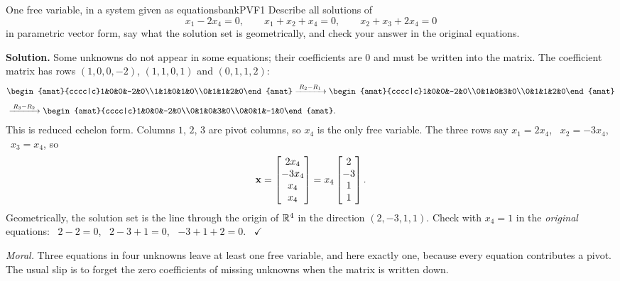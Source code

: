 \documentclass[11pt]{article}
\begin{document}
\begin{exmp}{One free variable, in a system given as equations}{bankPVF1}
Describe all solutions of
\[
x_1-2x_4=0,\qquad x_1+x_2+x_4=0,\qquad x_2+x_3+2x_4=0
\]
in parametric vector form, say what the solution set is geometrically, and check your answer in the original equations.

\textbf{Solution.} Some unknowns do not appear in some equations; their coefficients are $0$ and must be written into the matrix. The coefficient matrix has rows $(1,0,0,-2)$, $(1,1,0,1)$ and $(0,1,1,2)$:
\begin{align*}
&\begin{amat}{cccc|c}1&0&0&-2&0\\1&1&0&1&0\\0&1&1&2&0\end{amat}
\rops{R_2-R_1}
\begin{amat}{cccc|c}1&0&0&-2&0\\0&1&0&3&0\\0&1&1&2&0\end{amat}\\[4pt]
&\rops{R_3-R_2}
\begin{amat}{cccc|c}1&0&0&-2&0\\0&1&0&3&0\\0&0&1&-1&0\end{amat}.
\end{align*}
This is reduced echelon form. Columns $1$, $2$, $3$ are pivot columns, so $x_4$ is the only free variable. The three rows say $x_1=2x_4$, \ $x_2=-3x_4$, \ $x_3=x_4$, so
\[
\mathbf{x}=\begin{bmatrix}2x_4\\-3x_4\\x_4\\x_4\end{bmatrix}=x_4\begin{bmatrix}2\\-3\\1\\1\end{bmatrix}.
\]
Geometrically, the solution set is the line through the origin of $\mathbb{R}^4$ in the direction $(2,-3,1,1)$. Check with $x_4=1$ in the \emph{original} equations: \ $2-2=0$, \ $2-3+1=0$, \ $-3+1+2=0$. \ $\checkmark$

\emph{Moral.} Three equations in four unknowns leave at least one free variable, and here exactly one, because every equation contributes a pivot. The usual slip is to forget the zero coefficients of missing unknowns when the matrix is written down.
\end{exmp}
\end{document}
